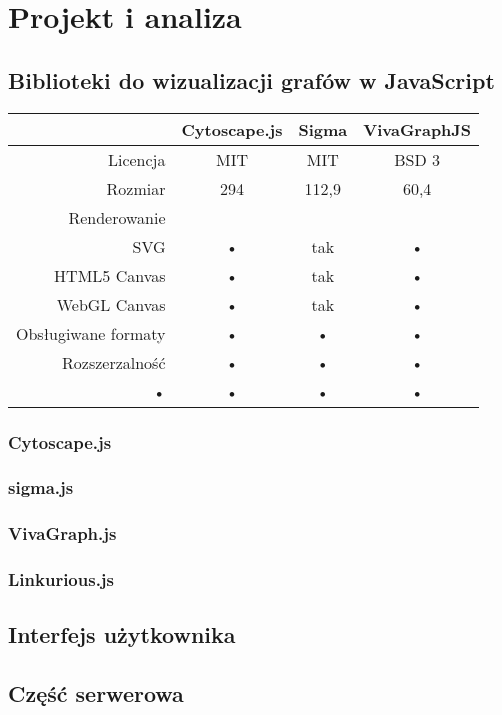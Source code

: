 \chapter{Projekt i analiza}
\section{Biblioteki do wizualizacji grafów w JavaScript}

\begin{tabularx}{\textwidth}{|r|c|c|c}
\hline 
 & Cytoscape.js & Sigma & VivaGraphJS \\ 
\hline 
Licencja & MIT & MIT & BSD 3 \\ 
\hline 
Rozmiar & 294 & 112,9 & 60,4 \\ 
\hline 
Renderowanie & & & \\
SVG & • & tak & • \\
HTML5 Canvas & • & tak & • \\
WebGL Canvas & • & tak & • \\ 
\hline 
Obsługiwane formaty & • & • & • \\ 
\hline
Rozszerzalność & • & • & • \\ 
\hline 
• & • & • & • \\ 
\hline 
\end{tabularx} 
\subsection{Cytoscape.js}
\subsection{sigma.js}
\subsection{VivaGraph.js}
\subsection{Linkurious.js}

\section{Interfejs użytkownika}
\section{Część serwerowa}